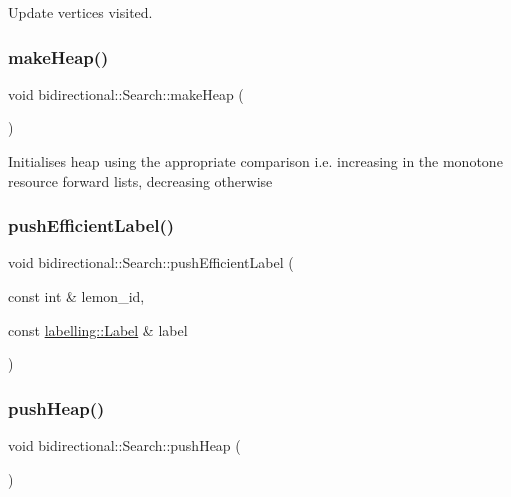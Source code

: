 Update vertices visited. 

\mbox{\label{classbidirectional_1_1Search_af38a13e27dcd3b69e78dc7943ee90f46}} 
\subsubsection{\texorpdfstring{make\+Heap()}{makeHeap()}}
{\footnotesize\ttfamily void bidirectional\+::\+Search\+::make\+Heap (\begin{DoxyParamCaption}{ }\end{DoxyParamCaption})}

Initialises heap using the appropriate comparison i.\+e. increasing in the monotone resource forward lists, decreasing otherwise \mbox{\label{classbidirectional_1_1Search_a729c7a379b04d777ac0bc844e5b488b7}} 
\subsubsection{\texorpdfstring{push\+Efficient\+Label()}{pushEfficientLabel()}}
{\footnotesize\ttfamily void bidirectional\+::\+Search\+::push\+Efficient\+Label (\begin{DoxyParamCaption}\item[{const int \&}]{lemon\+\_\+id,  }\item[{const \hyperlink{classlabelling_1_1Label}{labelling\+::\+Label} \&}]{label }\end{DoxyParamCaption})\hspace{0.3cm}{\ttfamily [inline]}}

\mbox{\label{classbidirectional_1_1Search_a2c1a7067a4ce02805e8ab5f9beac8c7c}} 
\subsubsection{\texorpdfstring{push\+Heap()}{pushHeap()}}
{\footnotesize\ttfamily void bidirectional\+::\+Search\+::push\+Heap (\begin{DoxyParamCaption}{ }\end{DoxyParamCaption})}

